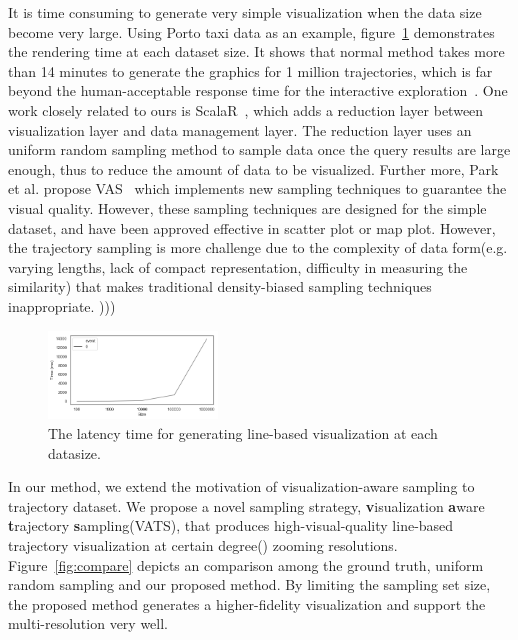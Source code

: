 It is time consuming to generate very simple visualization when the data size become very large. Using Porto taxi data \cite{porto_taxi} as an example, figure~\ref{fig:rendering_time} demonstrates the rendering time at each dataset size. It shows that normal method takes more than 14 minutes to generate the graphics for 1 million trajectories, which is far beyond the human-acceptable response time for the interactive exploration~\cite{shneiderman1984response}.
One work closely related to ours is ScalaR~\cite{battle2013dynamic}, which adds a reduction layer between visualization layer and data management layer. The reduction layer uses an uniform random sampling method to sample data once the query results are large enough, thus to reduce the amount of data to be visualized.
Further more, Park et al. propose VAS~\cite{park2016visualization} which implements new sampling techniques to guarantee the visual quality. However, these sampling techniques are designed for the simple dataset, and have been approved effective in scatter plot or map plot. However, the trajectory sampling is more challenge due to the complexity of data form(e.g. varying lengths, lack of compact representation, difficulty in measuring the similarity) that makes traditional density-biased sampling techniques inappropriate.  )))


\begin{figure}[t]
	\centering
	\includegraphics[width=0.4\textwidth]{pictures/introduction/timesize.png}
	\vspace{-5mm}
	\caption{The latency time for generating line-based visualization at each datasize.}
	\vspace{-5mm}
	\label{fig:rendering_time}
\end{figure}


In our method, we extend the motivation of visualization-aware sampling to trajectory dataset. We propose a novel sampling strategy, \textbf{v}isualization \textbf{a}ware \textbf{t}rajectory \textbf{s}ampling(VATS), that produces high-visual-quality line-based trajectory visualization at certain degree() zooming resolutions. 
Figure~\ref{fig:compare} depicts an comparison among the ground truth,  uniform random sampling and our proposed method. By limiting the sampling set size, the proposed method generates a higher-fidelity visualization and support the multi-resolution very well.   

